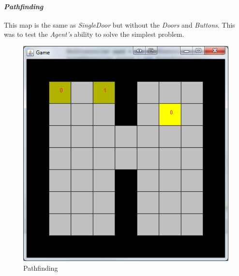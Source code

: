 \documentclass{IEEEtran}
\begin{document}
\paragraph{\emph{Pathfinding}} This map is the same as \emph{SingleDoor} but without the \emph{Doors} and \emph{Buttons}. This was to test the \emph{Agent's} ability to solve the simplest problem.
\begin{figure}[H]
\centering
\includegraphics[scale=0.35]{level1e}
\caption{Pathfinding}
\label{Pathfinding}
\end{figure}
\end{document}
